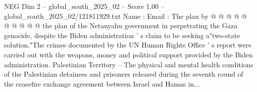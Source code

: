 \begin{textsample}{NEG Dim 2 – global\_south\_2025\_02 – Score 1.00 – global\_south\_2025\_02/121811929.txt}
Name : Email : The plan by @ @ @ @ @ @ @ @ @ @ the plan of the Netanyahu government in perpetrating the Gaza genocide, despite the Biden administration ' s claim to be seeking a"two-state solution."The crimes documented by the UN Human Rights Office ' s report were carried out with the weapons, money and political support provided by the Biden administration.
Palestinian Territory -- The physical and mental health conditions of the Palestinian detainees and prisoners released during the seventh round of the ceasefire exchange agreement between Israel and Hamas in...

\end{textsample}
